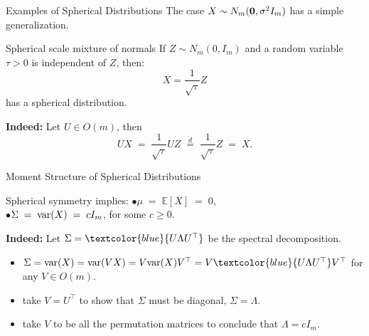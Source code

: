 \documentclass[11pt,handout,aspectratio=169]{beamer}
\begin{document}
\begin{frame}{Examples of Spherical Distributions}
The case $X\sim N_m(\boldsymbol 0,\sigma^2 I_m)$ has a simple generalization.\\[3mm]
\begin{block}{Spherical scale mixture of normals}
	If $Z \sim N_m(0, I_m)$ and a random variable $\tau > 0$ is independent of $Z$, then:
      \begin{equation*}
        X = \frac{1}{\sqrt{\tau}} Z
      \end{equation*}
      has a spherical distribution.
\end{block}
  \textbf{Indeed:} Let $U \in O(m)$, then 
$$    UX \;=\; \frac{1}{\sqrt{\tau}} UZ \;\overset{d}{=}\; \frac{1}{\sqrt{\tau}} Z \;=\; X.$$
\end{frame}

\begin{frame}{Moment Structure of Spherical Distributions}
\begin{alertblock}{Spherical symmetry implies:}
  $\bullet$\quad      $\mu\;=\;\mathbb{E}[X] \;=\; 0$, \\
  $\bullet$\quad      $\Sigma\;=\;\mathrm{var}(X) \;=\; c I_m$, \quad for some $c \geq 0$. 
      \end{alertblock}
      \medskip
      
      \textbf{Indeed:} Let $\Sigma=\textcolor{blue}{U\Lambda U^\top} $ be the spectral decomposition.
      \begin{itemize}
      	\item $\Sigma=\var(X)=\var(VX)=V \var(X)V^\top=V\textcolor{blue}{U\Lambda U^\top} V^\top$ for any $V\in O(m)$.
      	\item take $V=U^\top$ to show that $\Sigma$ must be diagonal, $\Sigma=\Lambda$.
      	\item take $V$ to be all the \alert{permutation matrices} to conclude that $\Lambda=c I_m$.  
      \end{itemize} 
%
\end{frame}
\end{document}
